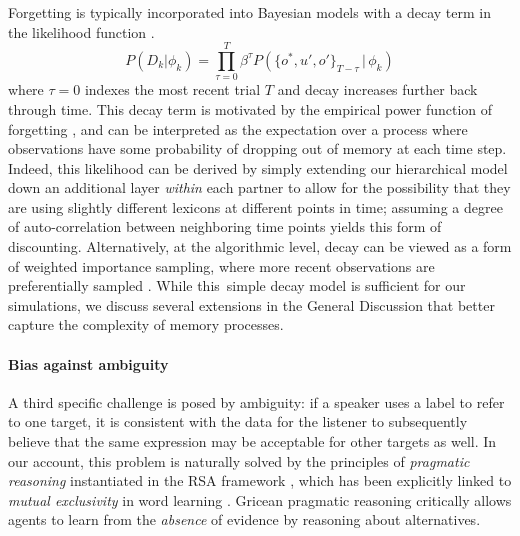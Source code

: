 Forgetting is typically incorporated into Bayesian models with a decay term in the likelihood function \cite{anderson2000adaptive,angela2009sequential,fudenberg2014recency,kalm2018visual}.
$$P(D_k | \phi_k) = \prod_{\tau=0}^T \beta^{\tau} P(\{o^*,u',o'\}_{T-\tau}\, |\, \phi_k)$$
where $\tau=0$ indexes the most recent trial $T$ and decay increases further back through time.
This decay term is motivated by the empirical power function of forgetting \cite{wixted1991form}, and can be interpreted as the expectation over a process where observations have some probability of dropping out of memory at each time step.
Indeed, this likelihood can be derived by simply extending our hierarchical model down an additional layer \emph{within} each partner to allow for the possibility that they are using slightly different lexicons at different points in time; assuming a degree of auto-correlation between neighboring time points yields this form of discounting.
Alternatively, at the algorithmic level, decay can be viewed as a form of weighted importance sampling, where more recent observations are preferentially sampled \cite{pearl2010online}.
While this simple decay model is sufficient for our simulations, we discuss several extensions in the General Discussion that better capture the complexity of memory processes.

\paragraph{Bias against ambiguity}

A third specific challenge is posed by ambiguity: if a speaker uses a label to refer to one target, it is consistent with the data for the listener to subsequently believe that the same expression may be acceptable for other targets as well. 
In our account, this problem is naturally solved by the principles of \textit{pragmatic reasoning} instantiated in the RSA framework \cite{Grice75_LogicConversation}, which has been explicitly linked to \emph{mutual exclusivity} in word learning \cite{bloom2002children,FrankGoodmanTenenbaum09_Wurwur,SmithGoodmanFrank13_RecursivePragmaticReasoningNIPS,gulordava2020one,ohmerreinforcement}.
Gricean pragmatic reasoning critically allows agents to learn from the \emph{absence} of evidence by reasoning about alternatives. 

